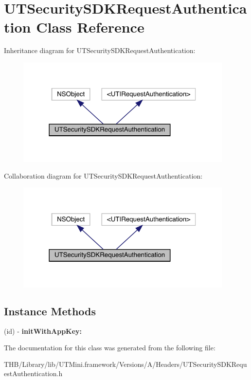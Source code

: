 \hypertarget{interface_u_t_security_s_d_k_request_authentication}{}\section{U\+T\+Security\+S\+D\+K\+Request\+Authentication Class Reference}
\label{interface_u_t_security_s_d_k_request_authentication}


Inheritance diagram for U\+T\+Security\+S\+D\+K\+Request\+Authentication\+:\nopagebreak
\begin{figure}[H]
\begin{center}
\leavevmode
\includegraphics[width=306pt]{interface_u_t_security_s_d_k_request_authentication__inherit__graph}
\end{center}
\end{figure}


Collaboration diagram for U\+T\+Security\+S\+D\+K\+Request\+Authentication\+:\nopagebreak
\begin{figure}[H]
\begin{center}
\leavevmode
\includegraphics[width=306pt]{interface_u_t_security_s_d_k_request_authentication__coll__graph}
\end{center}
\end{figure}
\subsection*{Instance Methods}
\begin{DoxyCompactItemize}
\item 
\mbox{\label{interface_u_t_security_s_d_k_request_authentication_a2a3be801148795c8abc4dc5fc9adbac8}} 
(id) -\/ {\bfseries init\+With\+App\+Key\+:}
\end{DoxyCompactItemize}


The documentation for this class was generated from the following file\+:\begin{DoxyCompactItemize}
\item 
T\+H\+B/\+Library/lib/\+U\+T\+Mini.\+framework/\+Versions/\+A/\+Headers/U\+T\+Security\+S\+D\+K\+Request\+Authentication.\+h\end{DoxyCompactItemize}
